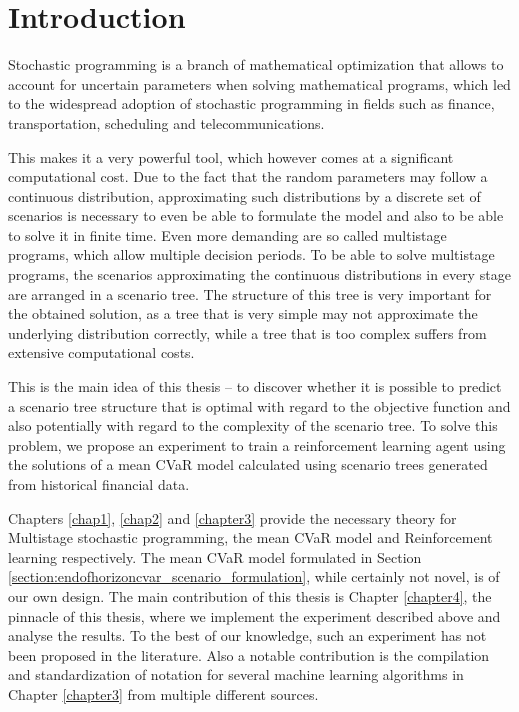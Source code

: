 \chapter*{Introduction}
Stochastic programming is a branch of mathematical optimization that allows to account for uncertain parameters when solving mathematical programs, which led to the widespread adoption of stochastic programming in fields such as finance, transportation, scheduling and telecommunications. 

This makes it a very powerful tool, which however comes at a significant computational cost. Due to the fact that the random parameters may follow a continuous distribution, approximating such distributions by a discrete set of scenarios is necessary to even be able to formulate the model and also to be able to solve it in finite time. Even more demanding are so called multistage programs, which allow multiple decision periods. To be able to solve multistage programs, the scenarios approximating the continuous distributions in every stage are arranged in a scenario tree. The structure of this tree is very important for the obtained solution, as a tree that is very simple may not approximate the underlying distribution correctly, while a tree that is too complex suffers from extensive computational costs. 

This is the main idea of this thesis -- to discover whether it is possible to predict a scenario tree structure that is optimal with regard to the objective function and also potentially with regard to the complexity of the scenario tree. To solve this problem, we propose an experiment to train a reinforcement learning agent using the solutions of a mean CVaR model calculated using scenario trees generated from historical financial data. 

Chapters \ref{chap1}, \ref{chap2} and \ref{chapter3} provide the necessary theory for Multistage stochastic programming, the mean CVaR model and Reinforcement learning respectively. The mean CVaR model formulated in Section \ref{section:endofhorizoncvar_scenario_formulation}, while certainly not novel, is of our own design.  The main contribution of this thesis is Chapter \ref{chapter4}, the pinnacle of this thesis, where we implement the experiment described above and analyse the results. To the best of our knowledge, such an experiment has not been proposed in the literature. Also a notable contribution is the compilation and standardization of notation for several machine learning algorithms in Chapter \ref{chapter3} from multiple different sources.